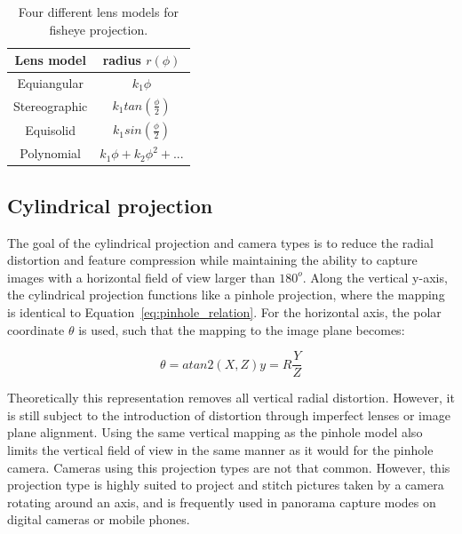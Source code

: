 \begin{table}[!htb]
    \centering
    \caption{Four different lens models for fisheye projection.}
    \label{tab:theory_fisheye_lens_model}
    \begin{tabular}{|c|c|} \hline
        Lens model & radius $r(\phi)$ \\ \hline
        Equiangular & $k_1\phi$\\ \hline
        Stereographic & $k_1 tan\left(\frac{\phi}{2}\right)$\\ \hline
        Equisolid & $k_1 sin\left(\frac{\phi}{2}\right)$\\ \hline 
        Polynomial & $k_1 \phi + k_2 \phi^2 + ...$\\ \hline
    \end{tabular}
\end{table}

\subsection{Cylindrical projection}

The goal of the cylindrical projection and camera types is to reduce the radial distortion and feature compression while maintaining the ability to capture images with a horizontal field of view larger than $180^o$. Along the vertical y-axis, the cylindrical projection functions like a pinhole projection, where the mapping is identical to Equation~\eqref{eq:pinhole_relation}. For the horizontal axis, the polar coordinate $\theta$ is used, such that the mapping to the image plane becomes:

\begin{subequations}
\begin{equation}
    \theta = atan2\left(X,Z\right)
    \label{eq:cylindrical_theta}
\end{equation}
\begin{equation}
    y = R\frac{Y}{Z}
    \label{eq:cylindrical_y}
\end{equation}
\label{eq:cylindrical}
\end{subequations}

Theoretically this representation removes all vertical radial distortion. However, it is still subject to the introduction of distortion through imperfect lenses or image plane alignment. Using the same vertical mapping as the pinhole model also limits the vertical field of view in the same manner as it would for the pinhole camera. Cameras using this projection types are not that common. However, this projection type is highly suited to project and stitch pictures taken by a camera rotating around an axis, and is frequently used in panorama capture modes on digital cameras or mobile phones.

